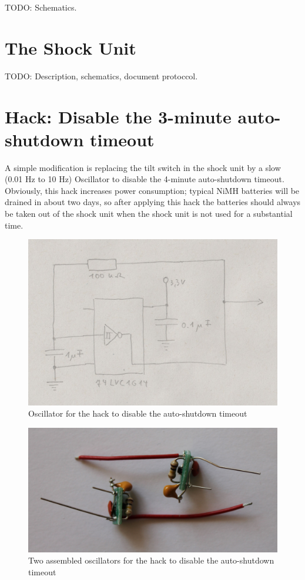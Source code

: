 \documentclass[a4paper]{article}
\begin{document}
TODO: Schematics.

\section{The Shock Unit}

TODO: Description, schematics, document protoccol.

\section{Hack: Disable the 3-minute auto-shutdown timeout}

A simple modification is replacing the tilt switch in the shock unit by a slow (0.01 Hz to 10 Hz) Oscillator to disable the 4-minute auto-shutdown timeout. Obviously, this hack increases power consumption; typical NiMH batteries will be drained in about two days, so after applying this hack the batteries should always be taken out of the shock unit when the shock unit is not used for a substantial time.

\begin{figure}
	\centerline{\includegraphics[scale=1.0]{auto-shutdown-timeout-hack.jpeg}}
	\caption{\label{auto-shutdown-timeout-hack}Oscillator for the hack to disable the auto-shutdown timeout}
\end{figure}

\begin{figure}
	\centerline{\includegraphics[scale=0.1]{auto-shutdown-timeout-hacks.jpeg}}
	\caption{\label{auto-shutdown-timeout-hacks}Two assembled oscillators for the hack to disable the auto-shutdown timeout}
\end{figure}
\end{document}

